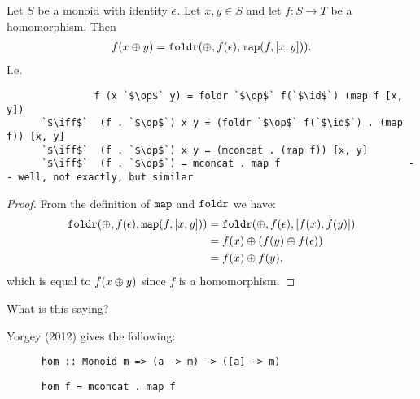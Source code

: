 \begin{theorem*}
  Let $S$ be a monoid with identity $\epsilon$. Let $x, y \in S$ and let $f:S \to T$ be a
  homomorphism. Then
  \begin{align*}
    f(x \oplus y) = \text{{\tt foldr}}(\oplus, f(\epsilon), \text{{\tt map}}(f, [x, y])).
  \end{align*}
  I.e.
  \begin{normalfont}
    \begin{verbatim}
               f (x `$\op$` y) = foldr `$\op$` f(`$\id$`) (map f [x, y])
      `$\iff$`  (f . `$\op$`) x y = (foldr `$\op$` f(`$\id$`) . (map f)) [x, y]
      `$\iff$`  (f . `$\op$`) x y = (mconcat . (map f)) [x, y]
      `$\iff$`  (f . `$\op$`) = mconcat . map f                      -- well, not exactly, but similar
    \end{verbatim}
  \end{normalfont}
\end{theorem*}

\begin{proof}
  From the definition of $\text{{\tt map}}$ and $\text{{\tt foldr}}$ we have:
  \begin{align*}
    \text{{\tt foldr}}(\oplus, f(\epsilon), \text{{\tt map}}(f, [x, y]))
    &= \text{{\tt foldr}}(\oplus, f(\epsilon), [f(x), f(y)])\\
    &= f(x) \oplus (f(y) \oplus f(\epsilon))\\
    &= f(x) \oplus f(y),
  \end{align*}
  which is equal to $f(x \oplus y)$ since $f$ is a homomorphism.
\end{proof}

\begin{remark*}
  What is this saying?


\end{remark*}

Yorgey (2012) gives the following:

\begin{definition*}\hspace{0pt}
  \begin{normalfont}
    \begin{verbatim}
      hom :: Monoid m => (a -> m) -> ([a] -> m)
    \end{verbatim}
  \end{normalfont}
\end{definition*}

\begin{theorem*}\hspace{0pt}
  \begin{normalfont}
    \begin{verbatim}
      hom f = mconcat . map f
    \end{verbatim}
  \end{normalfont}
\end{theorem*}

